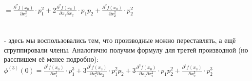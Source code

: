 \documentclass[book, 11pt]{report}
\begin{document}
{        $\displaystyle=\frac{\partial^2f(x_0)}{\partial x_{1}^2}\cdot p_1^2+2\frac{\partial^2f(x_0)}{\partial x_{1}\partial x_{2}}\cdot p_1p_2+\frac{\partial^2f(x_0)}{\partial x_{2}^2}\cdot p_2^2$ \\ \\ \\
        - здесь мы воспользовались тем, что производные можно переставлять, а ещё сгруппировали члены. Аналогично получим формулу для третей производной (но расспишем её менее подробно):\\
        $\displaystyle \phi^{(3)}(0)=\frac{\partial^3f(x_0)}{\partial x_1^3}\cdot p_1^3+3\frac{\partial^3f(x_0)}{\partial x_1^2\partial x_2}\cdot p_1^2p_2+3\frac{\partial^3f(x_0)}{\partial x_1\partial x_2^2}\cdot p_1p_2^2+\frac{\partial^3f(x_0)}{\partial x_2^3}\cdot p_2^3$
        }
\end{document}
